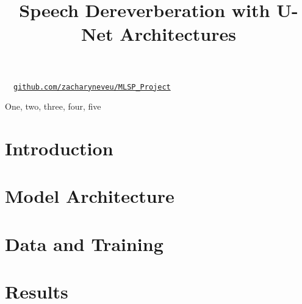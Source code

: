 \documentclass{article}
\title{Speech Dereverberation with U-Net Architectures}
\begin{document}
%

\maketitle
%

\begin{center}
\ \ \href{https://github.com/zacharyneveu/MLSP\_Project}{\texttt{github.com/zacharyneveu/MLSP\_Project}}
\end{center}

\begin{abstract}

\end{abstract}
%
\begin{keywords}
One, two, three, four, five
\end{keywords}
%
\section{Introduction}
\label{sec:intro}


\section{Model Architecture}%
\label{sec:model_architecture}


\section{Data and Training}%
\label{sec:data_and_training}


\section{Results}%
\label{sec:results}






\end{document}
